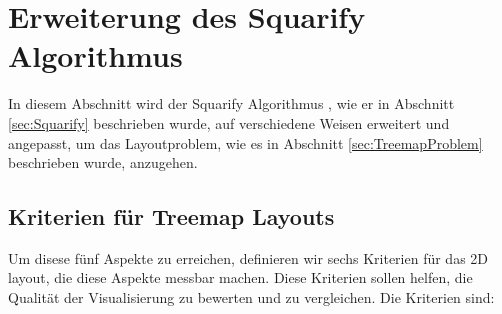\chapter{Erweiterung des Squarify Algorithmus} \label{sec:VerbesserungSquarify}
In diesem Abschnitt wird der Squarify Algorithmus \cite{bruls2000squarified}, wie er in Abschnitt \ref{sec:Squarify} beschrieben wurde, auf verschiedene Weisen erweitert und angepasst, um das Layoutproblem, wie es in Abschnitt \ref{sec:TreemapProblem} beschrieben wurde, anzugehen. 


\section{Kriterien für Treemap Layouts} \label{sec:CodeCityLayouts}
Um disese fünf Aspekte zu erreichen, definieren wir sechs Kriterien für das 2D layout, die diese Aspekte messbar machen. Diese Kriterien sollen helfen, die Qualität der Visualisierung zu bewerten und zu vergleichen. Die Kriterien sind:

